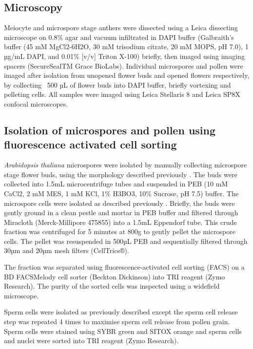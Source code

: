 \subsection{Microscopy}

Meiocyte and microspore stage anthers were dissected using a Leica dissecting microscope on 0.8\% agar and vacuum infiltrated in DAPI buffer (Galbraith’s buffer (45 mM MgCl2-6H2O, 30 mM trisodium citrate, 20 mM MOPS, pH 7.0), 1 µg/mL DAPI, and 0.01\% [v/v] Triton X-100) briefly, then imaged using imaging spacers (SecureSealTM Grace BioLabs). Individual microspores and pollen were imaged after isolation from unopened flower buds and opened flowers respectively, by collecting ~500 µL of flower buds into DAPI buffer, briefly vortexing and pelleting cells. All samples were imaged using Leica Stellaris 8 and Leica SP8X confocal microscopes.

\subsection{Isolation of microspores and pollen using fluorescence activated cell sorting}

\textit{Arabidopsis thaliana} microspores were isolated by manually collecting microspore stage flower buds, using the morphology described previously \citep{RN86}. The buds were collected into 1.5mL microcentrifuge tubes and suspended in PEB (10 mM CaCl2, 2 mM MES, 1 mM KCl, 1\% H3BO3, 10\% Sucrose, pH 7.5) buffer. The microspore cells were isolated as described previously \citep{RN140}. Briefly, the buds were gently ground in a clean pestle and mortar in PEB buffer and filtered through Miracloth (Merck-Millipore 475855) into a 1.5mL Eppendorf tube. This crude fraction was centrifuged for 5 minutes at 800g to gently pellet the microspore cells. The pellet was resuspended in 500µL PEB and sequentially filtered through 30µm and 20µm mesh filters (CellTrics®).

The fraction was separated using fluorescence-activated cell sorting (FACS) on a BD FACSMelody cell sorter (Beckton Dickinson) into TRI reagent (Zymo Research). The purity of the sorted cells was inspected using a widefield microscope.

Sperm cells were isolated as previously described \citep{RN140,RN141} except the sperm cell release step was repeated 4 times to maximise sperm cell release from pollen grain. Sperm cells were stained using SYBR green and SITOX orange and sperm cells and nuclei were sorted into TRI reagent (Zymo Research).

